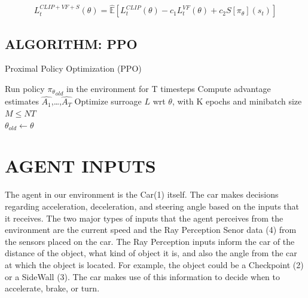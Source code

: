 
\begin{equation}
    L_{t}^{CLIP+VF+S}(\theta) = \hat{\mathbb{E}}[L_{t}^{CLIP}(\theta) - c_{1}L_{t}^{VF}(\theta) + c_{2}S[\pi_{\theta}](s_{t})] 
\end{equation}


\subsection{ALGORITHM: PPO} \label{ch4-ppo-alg}



\begin{algorithm}[H]
\caption{Proximal Policy Optimization (PPO)}\label{alg:ppo}
\begin{algorithmic}
\State Run policy ${\pi_{\theta}}_{old}$ in the environment for T timesteps
\State Compute advantage estimates $\hat{A_{1}}$,\ldots,$\hat{A_{T}}$
\EndFor
\State Optimize surroage $L$ wrt $\theta$, with K epochs and minibatch size $M \leq NT$\\
\State $\theta_{old} \gets \theta$
\EndFor
\end{algorithmic}
\end{algorithm}


\section{AGENT INPUTS} \label{ch4inp}

The agent in our environment is the Car(1) itself. The car makes
decisions regarding acceleration, deceleration, and steering angle
based on the inputs that it receives. The two major types of inputs
that the agent perceives from the environment are the current speed
and the Ray Perception Senor data (4) from the sensors placed on the
car. The Ray Perception inputs inform the car of the distance of the
object, what kind of object it is, and also the angle from the car at
which the object is located. For example, the object could be a
Checkpoint (2) or a SideWall (3). The car makes use of this
information to decide when to accelerate, brake, or turn.

